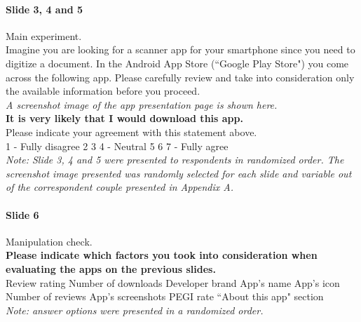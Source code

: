 \paragraph{Slide 3, 4 and 5} Main experiment.\\
Imagine you are looking for a scanner app for your smartphone since you need to digitize a document. In the Android App Store (``Google Play Store") you come across the following app. Please carefully review and take into consideration only the available information before you proceed.\\
\emph{A screenshot image of the app presentation page is shown here.}\\
\textbf{It is very likely that I would download this app.}\\
Please indicate your agreement with this statement above. \\
{\huge \Square} 1 - Fully disagree {\huge \Square} 2 {\huge \Square} 3 {\huge \Square} 4 - Neutral {\huge \Square} 5 {\huge \Square} 6 {\huge \Square} 7 - Fully agree\\
\emph{Note: Slide 3, 4 and 5 were presented to respondents in randomized order. The screenshot image presented was randomly selected for each slide and variable out of the correspondent couple presented in Appendix A.}

\paragraph{Slide 6} Manipulation check.\\
\textbf{Please indicate which factors you took into consideration when evaluating the apps on the previous slides.}\\
{\huge \Square} Review rating {\huge \Square} Number of downloads {\huge \Square} Developer brand {\huge \Square} App's name {\huge \Square} App's icon {\huge \Square} Number of reviews {\huge \Square} App's screenshots {\huge \Square} PEGI rate  {\huge \Square} ``About this app" section\\
\emph{Note: answer options were presented in a randomized order.}

